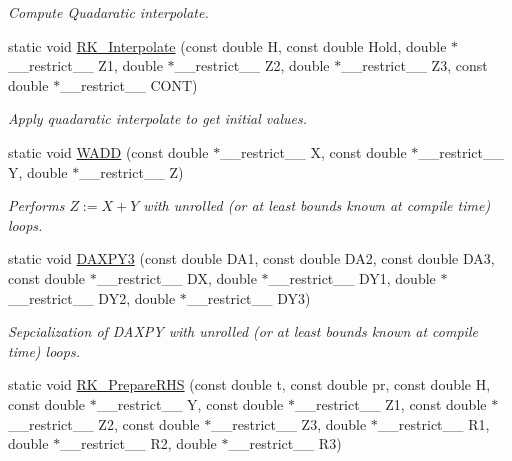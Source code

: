 \begin{DoxyCompactItemize}
\begin{DoxyCompactList}\small\item\em Compute Quadaratic interpolate. \end{DoxyCompactList}\item 
static void \hyperlink{namespaceradau2a_a5941fdd8c66eada16d6a0acaec4e1f78}{R\+K\+\_\+\+Interpolate} (const double H, const double Hold, double $\ast$\+\_\+\+\_\+restrict\+\_\+\+\_\+ Z1, double $\ast$\+\_\+\+\_\+restrict\+\_\+\+\_\+ Z2, double $\ast$\+\_\+\+\_\+restrict\+\_\+\+\_\+ Z3, const double $\ast$\+\_\+\+\_\+restrict\+\_\+\+\_\+ C\+O\+NT)
\begin{DoxyCompactList}\small\item\em Apply quadaratic interpolate to get initial values. \end{DoxyCompactList}\item 
static void \hyperlink{namespaceradau2a_afbf6ff499a4ff97db4b27df63b6fbffd}{W\+A\+DD} (const double $\ast$\+\_\+\+\_\+restrict\+\_\+\+\_\+ X, const double $\ast$\+\_\+\+\_\+restrict\+\_\+\+\_\+ Y, double $\ast$\+\_\+\+\_\+restrict\+\_\+\+\_\+ Z)
\begin{DoxyCompactList}\small\item\em Performs $Z:= X + Y$ with unrolled (or at least bounds known at compile time) loops. \end{DoxyCompactList}\item 
static void \hyperlink{namespaceradau2a_accc366d693bc987d4e9f3e5fcc5721b1}{D\+A\+X\+P\+Y3} (const double D\+A1, const double D\+A2, const double D\+A3, const double $\ast$\+\_\+\+\_\+restrict\+\_\+\+\_\+ DX, double $\ast$\+\_\+\+\_\+restrict\+\_\+\+\_\+ D\+Y1, double $\ast$\+\_\+\+\_\+restrict\+\_\+\+\_\+ D\+Y2, double $\ast$\+\_\+\+\_\+restrict\+\_\+\+\_\+ D\+Y3)
\begin{DoxyCompactList}\small\item\em Sepcialization of D\+A\+X\+PY with unrolled (or at least bounds known at compile time) loops. \end{DoxyCompactList}\item 
static void \hyperlink{namespaceradau2a_af5bc219a47482e040d93186def505f01}{R\+K\+\_\+\+Prepare\+R\+HS} (const double t, const double pr, const double H, const double $\ast$\+\_\+\+\_\+restrict\+\_\+\+\_\+ Y, const double $\ast$\+\_\+\+\_\+restrict\+\_\+\+\_\+ Z1, const double $\ast$\+\_\+\+\_\+restrict\+\_\+\+\_\+ Z2, const double $\ast$\+\_\+\+\_\+restrict\+\_\+\+\_\+ Z3, double $\ast$\+\_\+\+\_\+restrict\+\_\+\+\_\+ R1, double $\ast$\+\_\+\+\_\+restrict\+\_\+\+\_\+ R2, double $\ast$\+\_\+\+\_\+restrict\+\_\+\+\_\+ R3)

\end{DoxyCompactItemize}
